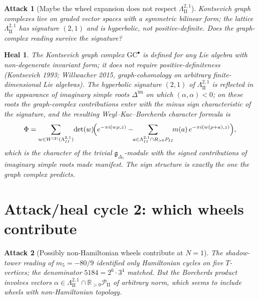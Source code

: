 \documentclass[11pt]{article}
\newtheorem*{attack}{Attack}
\newtheorem*{heal}{Heal}
\newcommand{\LII}{\Lambda^{2,1}_{\mathrm{II}}}
\newcommand{\PII}{\mathcal{P}_{\mathrm{II}}}
\newcommand{\Dlt}{\Delta_5}
\begin{document}
\begin{attack}[Maybe the wheel expansion does not respect $\LII$]
Kontsevich graph complexes live on graded vector spaces with a
symmetric bilinear form; the lattice $\LII$ has signature $(2,1)$
and is hyperbolic, not positive-definite. Does the graph-complex
reading survive the signature?
\end{attack}

\begin{heal}
The Kontsevich graph complex $\mathrm{GC}^\bullet$ is defined for any
Lie algebra with non-degenerate invariant form; it does not require
positive-definiteness (Kontsevich 1993; Willwacher 2015,
graph-cohomology on arbitrary finite-dimensional Lie algebras). The
hyperbolic signature $(2,1)$ of $\LII$ is reflected in the
appearance of \emph{imaginary} simple roots $\Delta^{\mathrm{im}}$
on which $(\alpha,\alpha)<0$; on these roots the graph-complex
contributions enter with the minus sign characteristic of the
signature, and the resulting Weyl--Kac--Borcherds character formula
is
\[
\Phi=\sum_{w\in W^{(2)}(\LII)}\!\det(w)\!
\Bigl(e^{-\pi i(w\rho,z)}-\!\!\sum_{a\in\LII\cap\mathbb{R}_{>0}\PII}\!\!
m(a)\,e^{-\pi i(w(\rho+a),z)}\Bigr),
\]
which is the character of the trivial $\mathfrak{g}_{\Dlt}$-module
with the signed contributions of imaginary simple roots made manifest.
The sign structure is exactly the one the graph complex predicts.
\end{heal}

\section{Attack/heal cycle 2: which wheels contribute}

\begin{attack}[Possibly non-Hamiltonian wheels contribute at $N=1$]
The shadow-tower reading of $m_5 = -80/9$ identified only Hamiltonian
cycles on five $T$-vertices; the denominator $5184 = 2^6\cdot 3^4$
matched. But the Borcherds product involves vectors
$\alpha\in\LII\cap\mathbb{R}_{>0}\PII$ of arbitrary norm, which seems
to include wheels with non-Hamiltonian topology.
\end{attack}
\end{document}
